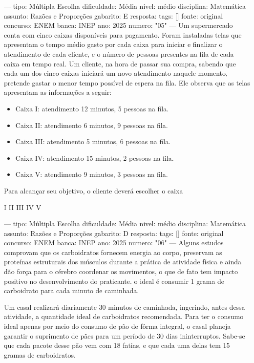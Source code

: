 ---
tipo: Múltipla Escolha
dificuldade: Média
nivel: médio
disciplina: Matemática
assunto: Razões e Proporções
gabarito: E
resposta:
tags: []
fonte: original
concurso: ENEM
banca: INEP
ano: 2025
numero: "05"
---
\question
Um supermercado conta com cinco caixas disponíveis para pagamento. Foram instaladas telas que apresentam o tempo médio gasto por cada caixa para iniciar e finalizar o atendimento de cada cliente, e o número de pessoas presentes na fila de cada caixa em tempo real. Um cliente, na hora de passar sua compra, sabendo que cada um dos cinco caixas iniciará um novo atendimento naquele momento, pretende gastar o menor tempo possível de espera na fila. Ele observa que as telas apresentam as informações a seguir:

\begin{itemize}
\item Caixa I: atendimento 12 minutos, 5 pessoas na fila.
\item Caixa II: atendimento 6 minutos, 9 pessoas na fila.
\item Caixa III: atendimento 5 minutos, 6 pessoas na fila.
\item Caixa IV: atendimento 15 minutos, 2 pessoas na fila.
\item Caixa V: atendimento 9 minutos, 3 pessoas na fila.
\end{itemize}

Para alcançar seu objetivo, o cliente deverá escolher o caixa
\begin{choices}
\choice I
\choice II
\choice III
\choice IV
\CorrectChoice V
\end{choices}

---
tipo: Múltipla Escolha
dificuldade: Média
nivel: médio
disciplina: Matemática
assunto: Razões e Proporções
gabarito: D
resposta:
tags: []
fonte: original
concurso: ENEM
banca: INEP
ano: 2025
numero: "06"
---
\question
Alguns estudos comprovam que os carboidratos fornecem energia ao corpo, preservam as proteínas estruturais dos músculos durante a prática de atividade física e ainda dão força para o cérebro coordenar os movimentos, o que de fato tem impacto positivo no desenvolvimento do praticante. o ideal é consumir 1 grama de carboidrato para cada minuto de caminhada.


Um casal realizará diariamente 30 minutos de caminhada, ingerindo, antes dessa atividade, a quantidade ideal de carboidratos recomendada. Para ter o consumo ideal apenas por meio do consumo de pão de fôrma integral, o casal planeja garantir o suprimento de pães para um período de 30 dias ininterruptos. Sabe-se que cada pacote desse pão vem com 18 fatias, e que cada uma delas tem 15 gramas de carboidratos.

